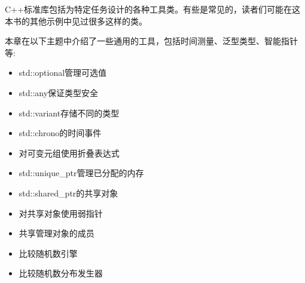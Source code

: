 C++标准库包括为特定任务设计的各种工具类。有些是常见的，读者们可能在这本书的其他示例中见过很多这样的类。

本章在以下主题中介绍了一些通用的工具，包括时间测量、泛型类型、智能指针等:

\begin{itemize}
\item 
std::optional管理可选值

\item 
std::any保证类型安全

\item 
std::variant存储不同的类型

\item 
std::chrono的时间事件

\item 
对可变元组使用折叠表达式

\item 
std::unique\_ptr管理已分配的内存

\item 
std::shared\_ptr的共享对象

\item 
对共享对象使用弱指针

\item 
共享管理对象的成员

\item 
比较随机数引擎

\item 
比较随机数分布发生器
\end{itemize}